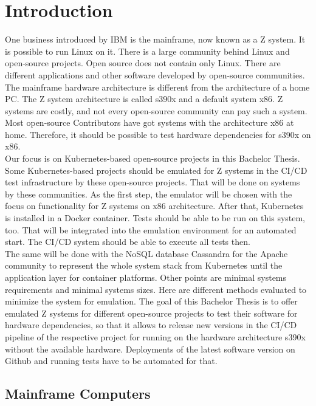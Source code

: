 \chapter{Introduction}\label{ch:intro}

One business introduced by IBM is the mainframe, now known as a Z system. It is possible to run Linux on it. There is a large community behind Linux and open-source projects. Open source does not contain only Linux. There are different applications and other software developed by open-source communities. The mainframe hardware architecture is different from the architecture of a home PC. The Z system architecture is called s390x and a default system x86. Z systems are costly, and not every open-source community can pay such a system. Most open-source Contributors have got systems with the architecture x86 at home. Therefore, it should be possible to test hardware dependencies for s390x on x86. \\
Our focus is on Kubernetes-based open-source projects in this Bachelor Thesis. Some Kubernetes-based projects should be emulated for Z systems in the CI/CD test infrastructure by these open-source projects. That will be done on systems by these communities. As the first step, the emulator will be chosen with the focus on functionality for Z systems on x86 architecture. After that, Kubernetes is installed in a Docker container. Tests should be able to be run on this system, too. That will be integrated into the emulation environment for an automated start. The CI/CD system should be able to execute all tests then. \\
The same will be done with the NoSQL database Cassandra for the Apache community to represent the whole system stack from Kubernetes until the application layer for container platforms. Other points are minimal systems requirements and minimal systems sizes. Here are different methods evaluated to minimize the system for emulation.
The goal of this Bachelor Thesis is to offer emulated Z systems for different open-source projects to test their software for hardware dependencies, so that it allows to release new versions in the CI/CD pipeline of the respective project for running on the hardware architecture s390x without the available hardware. Deployments of the latest software version on Github and running tests have to be automated for that.



\section{Mainframe Computers}


